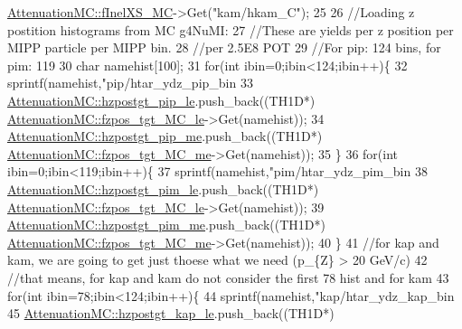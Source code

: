 \begin{DoxyCode}
{{{{      \hyperlink{class_neutrino_flux_reweight_1_1_attenuation_m_c_a5c8c620e955ec534263d78013c1c086a}{AttenuationMC::fInelXS\_MC}->Get(\textcolor{stringliteral}{"kam/hkam\_C"});
25     
26     \textcolor{comment}{//Loading z postition histograms from MC g4NuMI:}
27     \textcolor{comment}{//These are yields per z position per MIPP particle per MIPP bin.}
28     \textcolor{comment}{//per 2.5E8 POT}
29     \textcolor{comment}{//For pip: 124 bins, for pim: 119}
30     \textcolor{keywordtype}{char} namehist[100];
31     \textcolor{keywordflow}{for}(\textcolor{keywordtype}{int} ibin=0;ibin<124;ibin++)\{
32       sprintf(namehist,\textcolor{stringliteral}{"pip/htar\_ydz\_pip\_bin%
33       \hyperlink{class_neutrino_flux_reweight_1_1_attenuation_m_c_a96f19a370160ceee2c8bf61d93a34085}{AttenuationMC::hzpostgt\_pip\_le}.push\_back((TH1D*)
      \hyperlink{class_neutrino_flux_reweight_1_1_attenuation_m_c_a66fcb5745e72eda64f9081b5b0ef4399}{AttenuationMC::fzpos\_tgt\_MC\_le}->Get(namehist));
34       \hyperlink{class_neutrino_flux_reweight_1_1_attenuation_m_c_a4a4fe98dd8c926d1996b1bcf492b65cd}{AttenuationMC::hzpostgt\_pip\_me}.push\_back((TH1D*)
      \hyperlink{class_neutrino_flux_reweight_1_1_attenuation_m_c_a93e5ae3f1982c3dddd6c57ea47e230ea}{AttenuationMC::fzpos\_tgt\_MC\_me}->Get(namehist));
35     \}
36     \textcolor{keywordflow}{for}(\textcolor{keywordtype}{int} ibin=0;ibin<119;ibin++)\{
37       sprintf(namehist,\textcolor{stringliteral}{"pim/htar\_ydz\_pim\_bin%
38       \hyperlink{class_neutrino_flux_reweight_1_1_attenuation_m_c_a8e2000306243ba7ee0e93814ded1c964}{AttenuationMC::hzpostgt\_pim\_le}.push\_back((TH1D*)
      \hyperlink{class_neutrino_flux_reweight_1_1_attenuation_m_c_a66fcb5745e72eda64f9081b5b0ef4399}{AttenuationMC::fzpos\_tgt\_MC\_le}->Get(namehist));
39       \hyperlink{class_neutrino_flux_reweight_1_1_attenuation_m_c_ada00bc8840f8c94bdf92796e7c87b103}{AttenuationMC::hzpostgt\_pim\_me}.push\_back((TH1D*)
      \hyperlink{class_neutrino_flux_reweight_1_1_attenuation_m_c_a93e5ae3f1982c3dddd6c57ea47e230ea}{AttenuationMC::fzpos\_tgt\_MC\_me}->Get(namehist));
40     \}
41     \textcolor{comment}{//for kap and kam, we are going to get just thoese what we need (p\_\{Z\} > 20 GeV/c)}
42     \textcolor{comment}{//that means, for kap and kam do not consider the first 78 hist and for kam}
43     \textcolor{keywordflow}{for}(\textcolor{keywordtype}{int} ibin=78;ibin<124;ibin++)\{
44       sprintf(namehist,\textcolor{stringliteral}{"kap/htar\_ydz\_kap\_bin%
45       \hyperlink{class_neutrino_flux_reweight_1_1_attenuation_m_c_aa62930aa4128449906cd2b661a063355}{AttenuationMC::hzpostgt\_kap\_le}.push\_back((TH1D*)
}}}}}}}
\end{DoxyCode}
